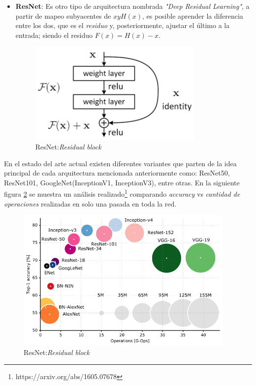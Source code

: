 \begin{itemize}
\item \textbf{ResNet}: Es otro tipo de arquitectura nombrada \textit{"Deep Residual Learning"}, a partir de mapeo subyacentes de $x y H (x)$, es posible aprender la diferencia entre los dos, que es el \textit{residuo} y, posteriormente, ajustar el último a la entrada; siendo el residuo $F(x) = H(x) - x$.

\begin{figure}[H]
 \centering
  \includegraphics[height=5cm,keepaspectratio=true,clip=true]{imagenes/MarcoTeorico/resnet.png}
  \caption{ResNet:\textit{Residual block}}
	\label{Fig:inception}
\end{figure}

\end{itemize}

En el estado del arte actual existen diferentes variantes que parten de la idea principal de cada arquitectura mencionada anteriormente como: ResNet50, ResNet101, GoogleNet(InceptionV1, InceptionV3), entre otras. En la siguiente figura \ref{Fig:cnn-analisis} se muestra un análisis realizado\footnote{https://arxiv.org/abs/1605.07678} comparando \textit{accuracy} vs \textit{cantidad de operaciones} realizadas en solo una pasada en toda la red.

\begin{figure}[H]
 \centering
  \includegraphics[height=7cm,keepaspectratio=true,clip=true]{imagenes/MarcoTeorico/cnn-analisis.png}
  \caption{ResNet:\textit{Residual block}}
	\label{Fig:cnn-analisis}
\end{figure}

